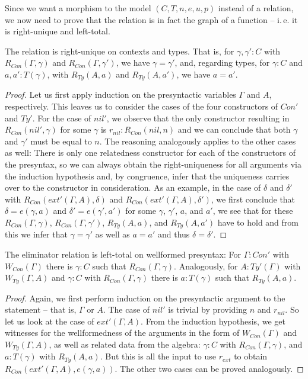Since we want a morphism to the model $(C, T, n, e, u, p)$ instead of a relation,
we now need to prove that the relation is in fact the graph of a function --
i.\,e. it is right-unique and left-total.

\begin{lemma}\label{lem:red-ex-right-unique}
The relation is right-unique on contexts and types. That is, for
$\gamma, \gamma' : C$ with $R_{Con}(\Gamma, \gamma)$ and $R_{Con}(\Gamma, \gamma')$,
we have $\gamma = \gamma'$, and, regarding types, for $\gamma : C$ and
$a, a' : T(\gamma)$, with $R_{Ty}(A, a)$ and $R_{Ty}(A, a')$,
we have $a = a'$.
\end{lemma}

\begin{proof}
Let us first apply induction on the presyntactic variables $\Gamma$ and $A$,
respectively.
This leaves us to consider the cases of the four constructors of $Con'$ and $Ty'$.
For the case of $nil'$, we observe that the only constructor resulting in
$R_{Con}(nil', \gamma)$ for some $\gamma$ is $r_{nil} : R_{Con}(nil, n)$ and we
can conclude that both $\gamma$ and $\gamma'$ must be equal to $n$.
The reasoning analogously applies to the other cases as well:
There is only one relatedness constructor for each of the constructors of the
presyntax, so we can always obtain the right-uniqueness for all arguments via
the induction hypothesis and, by congruence, infer that the uniqueness carries
over to the constructor in consideration.
As an example, in the case of $\delta$ and $\delta'$ with $R_{Con}(ext'(\Gamma, A), \delta)$
and $R_{Con}(ext'(\Gamma, A), \delta')$, we first conclude that
$\delta = e(\gamma, a)$ and $\delta' = e(\gamma', a')$ for some $\gamma$, $\gamma'$,
$a$, and $a'$, we see that for these $R_{Con}(\Gamma, \gamma)$, $R_{Con}(\Gamma, \gamma')$,
$R_{Ty}(A, a)$, and $R_{Ty}(A, a')$ have to hold and from this we infer
that $\gamma = \gamma'$ as well as $a = a'$ and thus $\delta = \delta'$.
\end{proof}

\begin{lemma}
The eliminator relation is left-total on wellformed presyntax:
For $\Gamma : Con'$ with $W_{Con}(\Gamma)$ there is $\gamma : C$
such that $R_{Con}(\Gamma, \gamma)$.
Analogously, for $A : Ty'(\Gamma)$ with $W_{Ty}(\Gamma, A)$
and $\gamma : C$ with $R_{Con}(\Gamma, \gamma)$
there is $a : T(\gamma)$
such that $R_{Ty}(A, a)$.
\end{lemma}

\begin{proof}
Again, we first perform induction on the presyntactic argument to the statement
-- that is, $\Gamma$ or $A$.
The case of $nil'$ is trivial by providing $n$ and $r_{nil}$.
So let us look at the case of $ext'(\Gamma, A)$.
From the induction hypothesis, we get witnesses for the wellformedness of the
arguments in the form of $W_{Con}(\Gamma)$ and $W_{Ty}(\Gamma, A)$,
as well as related data from the algebra:
$\gamma : C$ with $R_{Con}(\Gamma, \gamma)$, and
$a : T(\gamma)$ with $R_{Ty}(A, a)$.
But this is all the input to use $r_{ext}$ to obtain $R_{Con}(ext'(\Gamma, A), e(\gamma, a))$.
The other two cases can be proved analogously.
\end{proof}

